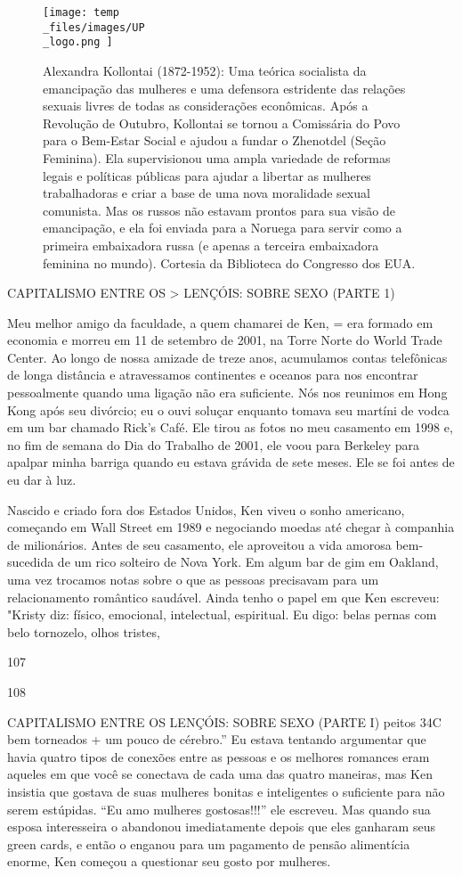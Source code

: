\begin{figure}
	\centering
	\texttt{[image: temp\\\_files/images/UP\\\_logo.png ]}
	\caption{Alexandra Kollontai (1872-1952): Uma teórica socialista da emancipação das mulheres e uma defensora estridente das relações sexuais livres de todas as considerações econômicas. Após a Revolução de Outubro, Kollontai se tornou a Comissária do Povo para o Bem-Estar Social e ajudou a fundar o Zhenotdel (Seção Feminina). Ela supervisionou uma ampla variedade de reformas legais e políticas públicas para ajudar a libertar as mulheres trabalhadoras e criar a base de uma nova moralidade sexual comunista. Mas os russos não estavam prontos para sua visão de emancipação, e ela foi enviada para a Noruega para servir como a primeira embaixadora russa (e apenas a terceira embaixadora feminina no mundo). Cortesia da Biblioteca do Congresso dos EUA.}
	\label{ }
\end{figure}
 \par 
CAPITALISMO ENTRE OS > LENÇÓIS: SOBRE SEXO (PARTE {\color{blue}1})
 \par 
Meu melhor amigo da faculdade, a quem chamarei de Ken, = era formado em economia e morreu em {\color{blue}11} de setembro de 2001, na Torre Norte do World Trade Center. Ao longo de nossa amizade de treze anos, acumulamos contas telefônicas de longa distância e atravessamos continentes e oceanos para nos encontrar pessoalmente quando uma ligação não era suficiente. Nós nos reunimos em Hong Kong após seu divórcio; eu o ouvi soluçar enquanto tomava seu martíni de vodca em um bar chamado Rick's Café. Ele tirou as fotos no meu casamento em 1998 e, no fim de semana do Dia do Trabalho de 2001, ele voou para Berkeley para apalpar minha barriga quando eu estava grávida de sete meses. Ele se foi antes de eu dar à luz.
 \par 
Nascido e criado fora dos Estados Unidos, Ken viveu o sonho americano, começando em Wall Street em 1989 e negociando moedas até chegar à companhia de milionários. Antes de seu casamento, ele aproveitou a vida amorosa bem-sucedida de um rico solteiro de Nova York. Em algum bar de gim em Oakland, uma vez trocamos notas sobre o que as pessoas precisavam para um relacionamento romântico saudável. Ainda tenho o papel em que Ken escreveu: "Kristy diz: físico, emocional, intelectual, espiritual. Eu digo: belas pernas com belo tornozelo, olhos tristes,
 \par 
107
 \par 
108
 \par 
CAPITALISMO ENTRE OS LENÇÓIS: SOBRE SEXO (PARTE I) peitos 34C bem torneados + um pouco de cérebro.” Eu estava tentando argumentar que havia quatro tipos de conexões entre as pessoas e os melhores romances eram aqueles em que você se conectava de cada uma das quatro maneiras, mas Ken insistia que gostava de suas mulheres bonitas e inteligentes o suficiente para não serem estúpidas. “Eu amo mulheres gostosas!!!” ele escreveu. Mas quando sua esposa interesseira o abandonou imediatamente depois que eles ganharam seus green cards, e então o enganou para um pagamento de pensão alimentícia enorme, Ken começou a questionar seu gosto por mulheres.
